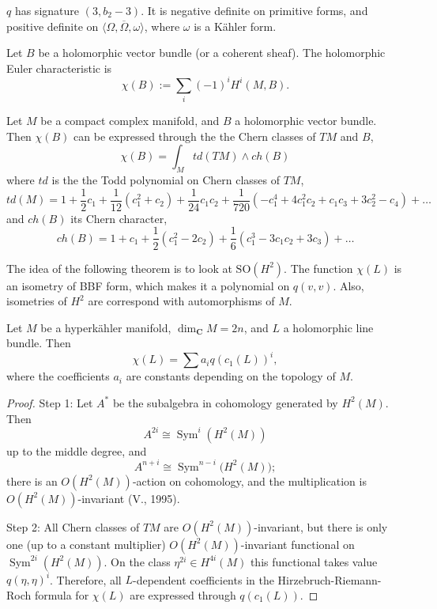 \begin{remark}
\label{remark-bbf-signature}
\(q\) has signature \((3,b_2-3)\). It is
negative definite on primitive forms, and
positive definite on \(\langle \Omega,
\overline{\Omega}, \omega \rangle\), where
\(\omega\) is a K\"ahler form.
\end{remark}

\begin{definition}
\label{definition-holomorphic-euler}
Let \(B\) be a holomorphic vector bundle (or
a coherent sheaf). The holomorphic Euler
characteristic is
\[
\chi(B) := \sum_i (-1)^i H^i(M,B).
\]
\end{definition}

\begin{theorem}
\label{theorem-rriemann-roch-hirzebruch}
Let \(M\) be a compact complex manifold, and
\(B\) a holomorphic vector bundle. Then
\(\chi(B)\) can be expressed through the
the Chern classes of \(TM\) and \(B\),
\[
\chi(B)=\int_M td(TM)\wedge ch(B)
\]
where \(td\) is the the Todd polynomial on
Chern classes of \(TM\),
\[
td(M)=1+\frac{1}{2}c_1+\frac{1}{12}(c_1^2+c_2)
+\frac{1}{24}c_1c_2+\frac{1}{720}
(-c_1^4+4c_1^2c_2+c_1c_3+3c_2^2-c_4)+\ldots
\]
and \(ch(B)\) its Chern character,
\[
ch(B)=1+c_1+\frac{1}{2}(c_1^2-2c_2)
+\frac{1}{6}(c_1^3-3c_1c_2+3c_3)+\ldots
\]
\end{theorem}

\noindent
The idea of the following theorem
is to look at $\text{SO}(H^2)$.
The function $\chi(L)$ is an isometry
of BBF form, which makes it a polynomial
on $q(v,v)$. Also, isometries of $H^2$
are correspond with automorphisms of $M$.

\begin{theorem}[Huybrechts]
\label{theorem-huybrechts}
Let \(M\) be a hyperk\"ahler manifold,
\(\dim_{\mathbf{C}} M = 2n\), and \(L\) a
holomorphic line bundle. Then
\[
\chi(L)=\sum a_i q(c_1(L))^i,
\]
where the coefficients \(a_i\) are constants
depending on the topology of \(M\).
\end{theorem}

\begin{proof}
Step 1: Let \(A^*\) be the subalgebra in
cohomology generated by \(H^2(M)\). Then
\[
A^{2i} \cong \operatorname{Sym}^i(H^2(M))
\]
up to the middle degree, and
\[
A^{n+i} \cong \operatorname{Sym}^{n-i}
\bigl(H^2(M)\bigr);
\]
there is an \(O(H^2(M))\)-action on
cohomology, and the multiplication is
\(O(H^2(M))\)-invariant (V., 1995).

Step 2: All Chern classes of \(TM\) are
\(O(H^2(M))\)-invariant, but there is only
one (up to a constant multiplier)
\(O(H^2(M))\)-invariant functional on
\(\operatorname{Sym}^{2i}(H^2(M))\). On the
class \(\eta^{2i} \in H^{4i}(M)\) this
functional takes value \(q(\eta,\eta)^i\).
Therefore, all \(L\)-dependent coefficients
in the Hirzebruch-Riemann-Roch formula for
\(\chi(L)\) are expressed through
\(q(c_1(L))\).
\end{proof}

